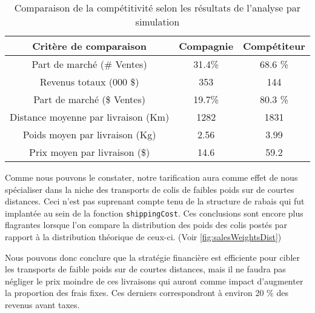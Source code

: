\begin{table}
	\begin{tabular}{ccc}
		\textbf{Critère de comparaison} & \textbf{Compagnie} & \textbf{Compétiteur} \\
		\hline
		Part de marché (\# Ventes) & 31.4\% & 68.6 \% \\
		Revenus totaux (000 \$) & 353 & 144 \\
		Part de marché (\$ Ventes) & 19.7\% & 80.3 \% \\
		Distance moyenne par livraison (Km) & 1282 & 1831 \\
		Poids moyen par livraison (Kg) & 2.56 & 3.99 \\
		Prix moyen par livraison (\$) & 14.6 & 59.2
	\end{tabular}
	\caption{Comparaison de la compétitivité selon les résultats de l'analyse par simulation}
	\label{tab:resultsComp}
\end{table}

Comme nous pouvons le constater, notre tarification aura comme effet de nous spécialiser dans la niche des transports de colis de faibles poids sur de courtes distances. Ceci n'est pas suprenant compte tenu de la structure de rabais qui fut implantée au sein de la fonction \texttt{shippingCost}. Ces conclusions sont encore plus flagrantes lorsque l'on compare la distribution des poids des colis postés par rapport à la distribution théorique de ceux-ci. (Voir \autoref{fig:salesWeightsDist}) \\


Nous pouvons donc conclure que la stratégie financière est efficiente pour cibler les transports de faible poids sur de courtes distances, mais il ne faudra pas négliger le prix moindre de ces livraisons qui auront comme impact d'augmenter la proportion des frais fixes. Ces derniers correspondront à environ 20 \% des revenus avant taxes.
